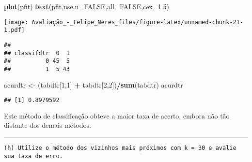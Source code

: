 \documentclass[]{article}
\newenvironment{Shaded}{\begin{snugshade}}{\end{snugshade}}
\newcommand{\KeywordTok}[1]{\textcolor[rgb]{0.13,0.29,0.53}{\textbf{#1}}}
\newcommand{\DataTypeTok}[1]{\textcolor[rgb]{0.13,0.29,0.53}{#1}}
\newcommand{\DecValTok}[1]{\textcolor[rgb]{0.00,0.00,0.81}{#1}}
\newcommand{\FloatTok}[1]{\textcolor[rgb]{0.00,0.00,0.81}{#1}}
\newcommand{\StringTok}[1]{\textcolor[rgb]{0.31,0.60,0.02}{#1}}
\newcommand{\OtherTok}[1]{\textcolor[rgb]{0.56,0.35,0.01}{#1}}
\newcommand{\OperatorTok}[1]{\textcolor[rgb]{0.81,0.36,0.00}{\textbf{#1}}}
\newcommand{\NormalTok}[1]{#1}
\begin{document}
\begin{Shaded}
\begin{Highlighting}[]
\KeywordTok{plot}\NormalTok{(pfit)}
\KeywordTok{text}\NormalTok{(pfit,}\DataTypeTok{use.n=}\OtherTok{FALSE}\NormalTok{,}\DataTypeTok{all=}\OtherTok{FALSE}\NormalTok{,}\DataTypeTok{cex=}\FloatTok{1.5}\NormalTok{)}
\end{Highlighting}
\end{Shaded}

\texttt{[image: Avaliação\_-\_Felipe\_Neres\_files/figure-latex/unnamed-chunk-21-1.pdf]}

\begin{Shaded}
\end{Shaded}

\begin{verbatim}
##           
## classifdtr  0  1
##          0 45  5
##          1  5 43
\end{verbatim}

\begin{Shaded}
\begin{Highlighting}[]
\NormalTok{acurdtr <-}\StringTok{ }\NormalTok{(tabdtr[}\DecValTok{1}\NormalTok{,}\DecValTok{1}\NormalTok{] }\OperatorTok{+}\StringTok{ }\NormalTok{tabdtr[}\DecValTok{2}\NormalTok{,}\DecValTok{2}\NormalTok{])}\OperatorTok{/}\KeywordTok{sum}\NormalTok{(tabdtr)}
\NormalTok{acurdtr}
\end{Highlighting}
\end{Shaded}

\begin{verbatim}
## [1] 0.8979592
\end{verbatim}

Este método de classificação obteve a maior taxa de acerto, embora não
tão distante dos demais métodos.

\begin{center}\rule{0.5\linewidth}{\linethickness}\end{center}

\begin{verbatim}
(h) Utilize o método dos vizinhos mais próximos com k = 30 e avalie sua taxa de erro.
\end{verbatim}
\end{document}
